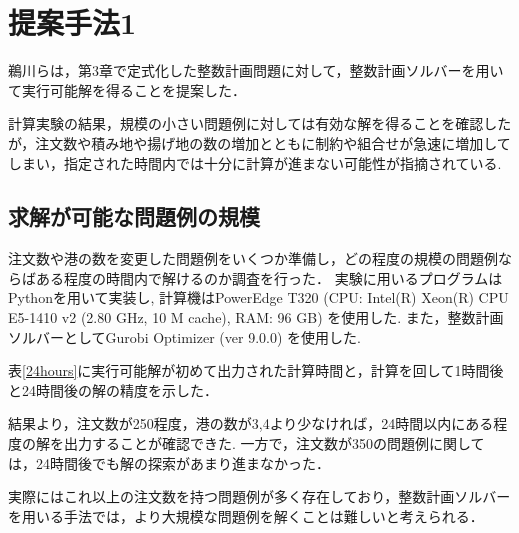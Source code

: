 \chapter{提案手法1}\label{method1}

\label {gurobiの計算実験}
鵜川ら\cite{ukawa}は，第3章で定式化した整数計画問題に対して，整数計画ソルバーを用いて実行可能解を得ることを提案した．

計算実験の結果，規模の小さい問題例に対しては有効な解を得ることを確認したが，注文数や積み地や揚げ地の数の増加とともに制約や組合せが急速に増加してしまい，指定された時間内では十分に計算が進まない可能性が指摘されている.

\section{求解が可能な問題例の規模}
\label{mip}
注文数や港の数を変更した問題例をいくつか準備し，どの程度の規模の問題例ならばある程度の時間内で解けるのか調査を行った．
実験に用いるプログラムは Pythonを用いて実装し, 計算機はPowerEdge T320 (CPU: Intel(R) Xeon(R) CPU E5-1410 v2 (2.80 GHz, 10 M cache), RAM: 96 GB) を使用した. また，整数計画ソルバーとしてGurobi Optimizer (ver 9.0.0) を使用した.

表\ref{24hours}に実行可能解が初めて出力された計算時間と，計算を回して1時間後と24時間後の解の精度を示した．

結果より，注文数が250程度，港の数が3,4より少なければ，24時間以内にある程度の解を出力することが確認できた.
一方で，注文数が350の問題例に関しては，24時間後でも解の探索があまり進まなかった．

実際にはこれ以上の注文数を持つ問題例が多く存在しており，整数計画ソルバーを用いる手法では，より大規模な問題例を解くことは難しいと考えられる．

